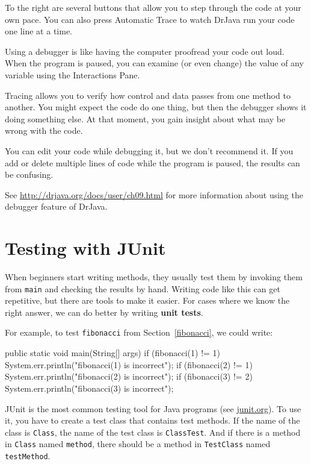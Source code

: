 \documentclass[12pt]{book}
\theoremstyle{exercise}
\newcommand{\java}[1]{\verb"#1"}
\begin{document}
To the right are several buttons that allow you to step through the code at your own pace.
You can also press {\sf Automatic Trace} to watch DrJava run your code one line at a time.

Using a debugger is like having the computer proofread your code out loud.
When the program is paused, you can examine (or even change) the value of any variable using the Interactions Pane.

Tracing allows you to verify how control and data passes from one method to another.
You might expect the code do one thing, but then the debugger shows it doing something else.
At that moment, you gain insight about what may be wrong with the code.

You can edit your code while debugging it, but we don't recommend it.
If you add or delete multiple lines of code while the program is paused, the results can be confusing.

See \url{http://drjava.org/docs/user/ch09.html} for more information about using the debugger feature of DrJava.

\section{Testing with JUnit}
\label{JUnit}


When beginners start writing methods, they usually test them by invoking them from \java{main} and checking the results by hand.
Writing code like this can get repetitive, but there are tools to make it easier.
For cases where we know the right answer, we can do better by writing {\bf unit tests}.

For example, to test \java{fibonacci} from Section~\ref{fibonacci}, we could write:

\begin{code}
    public static void main(String[] args) {
        if (fibonacci(1) != 1) {
            System.err.println("fibonacci(1) is incorrect");
        }
        if (fibonacci(2) != 1) {
            System.err.println("fibonacci(2) is incorrect");
        }
        if (fibonacci(3) != 2) {
            System.err.println("fibonacci(3) is incorrect");
        }
    }
\end{code}

JUnit is the most common testing tool for Java programs (see \url{junit.org}).
To use it, you have to create a test class that contains test methods.
If the name of the class is \java{Class}, the name of the test class is \java{ClassTest}.
And if there is a method in \java{Class} named \java{method}, there should be a method in \java{TestClass} named \java{testMethod}.
\end{document}
